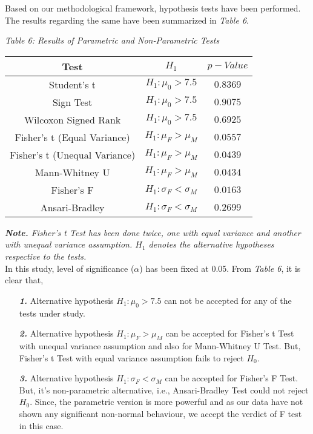 \documentclass[12pt,a4paper]{report}
\begin{document}
\Large{Based on our methodological framework, hypothesis tests have been performed. The results regarding the same have been summarized in \textit{Table 6}.}\\
\begin{center}
\Large{\textit{Table 6: Results of Parametric and Non-Parametric Tests}}\\
\begin{table}[hbt!]
\Centering
\Large
\begin{tabular}{c|c|c}
\hline
Test & $H_1$ & $p-Value$\\
\hline
\hline
Student's t & $H_1:\mu_0 > 7.5$ & $0.8369$\\
\hline
Sign Test & $H_1:\mu_0 > 7.5$ & $0.9075$\\
\hline
Wilcoxon Signed Rank & $H_1:\mu_0 > 7.5$ & $0.6925$\\
\hline
Fisher's t \small{(Equal Variance)} & $H_1:\mu_F > \mu_M$ & $0.0557$\\
\hline
Fisher's t \small{(Unequal Variance)} & $H_1:\mu_F > \mu_M$ & $0.0439$\\
\hline
Mann-Whitney U & $H_1:\mu_F > \mu_M$ & $0.0434$\\
\hline
Fisher's F & $H_1:\sigma_F < \sigma_M$ & $0.0163$\\
\hline
Ansari-Bradley & $H_1:\sigma_F < \sigma_M$ & $0.2699$\\
\hline
\end{tabular}
\end{table}
\end{center}
\large{\textit{{\textbf{Note.}} Fisher's t Test has been done twice, one with equal variance and another with unequal variance assumption. $H_1$ denotes the alternative hypotheses respective to the tests. }}\\[10pt]
\Large{In this study, level of significance ($\alpha$) has been fixed at 0.05. From \textit{Table 6}, it is clear that,}
\begin{enumerate}
    \item [\textit{\textbf{1.}}]
    \Large{Alternative hypothesis $H_1:\mu_0 > 7.5$ can not be accepted for any of the tests under study. }
     \item [\textit{\textbf{2.}}]
    \Large{Alternative hypothesis $H_1:\mu_F > \mu_M$ can be accepted for Fisher's t Test with unequal variance assumption and also for Mann-Whitney U Test. But, Fisher's t Test with equal variance assumption fails to reject $H_0$.}
    \item [\textit{\textbf{3.}}]
    \Large{Alternative hypothesis $H_1:\sigma_F < \sigma_M$ can be accepted for Fisher's F Test. But, it's non-parametric alternative, i.e., Ansari-Bradley Test could not reject $H_0$. Since, the parametric version is more powerful and as our data have not shown any significant non-normal behaviour, we accept the verdict of F test in this case.}
\end{enumerate}
\end{document}
